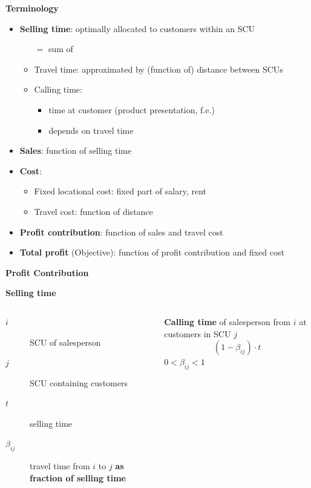 \begin{frame}{\textbf{Terminology}}
	\begin{itemize}[<+->]
	\item \textbf{Selling time}: optimally allocated to customers within an SCU
	\begin{itemize}
	  \item[$=$] sum of 
		\item Travel time: approximated by (function of) distance between SCUs
	  \item Calling time: 
		\begin{itemize}
			\item time at customer (product presentation, f.e.) 
			\item depends on travel time
		\end{itemize}
	\end{itemize}	
	\item \textbf{Sales}: function of selling time
	\item \textbf{Cost}:
	\begin{itemize}
	\item Fixed locational cost: fixed part of salary, rent
	\item Travel cost: function of distance
	\end{itemize}
	\item \textbf{Profit contribution}: function of sales and travel cost
	\item \textbf{Total profit} (Objective): function of profit contribution and fixed cost
\end{itemize}
\end{frame}


\begin{frame}
\begin{center}
{\LARGE \textbf{Profit Contribution}}
\end{center}
\end{frame}

\begin{frame}{\textbf{Selling time}}
\begin{columns}[T]
\centering

\begin{description}
  \item[$i$] SCU of salesperson
  \item[$j$] SCU containing customers
  \item[$t$] selling time
  \item[$\beta_{ij}$] travel time from $i$ to $j$ \textbf{as fraction of selling time}
\end{description}
\textbf{Calling time} of salesperson from $i$ at customers in SCU $j$ \[(1-\beta_{ij})\cdot t\]
$0<\beta_{ij}<1$
\end{columns}
\end{frame}

